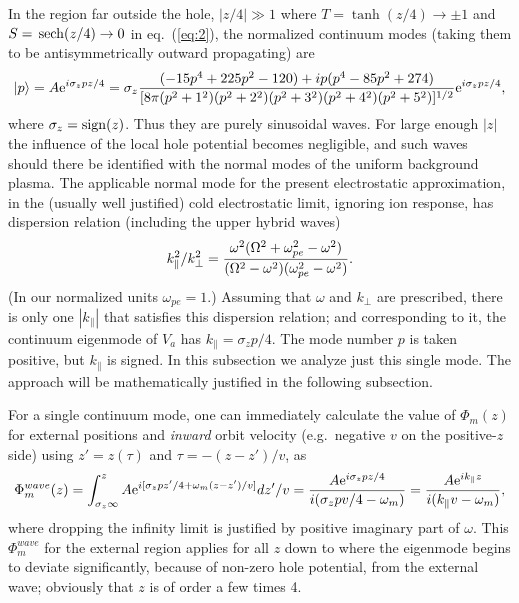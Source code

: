 \documentclass[12pt]{article}
\def\ket#1{|#1\rangle}
\def\sech{{\,\rm sech}}
\def\etothe#1{{\rm e}^{#1}}
\begin{document}
In the region far outside the hole, $|z/4|\gg 1$ where
$T=\tanh(z/4)\to\pm1$ and $S=\sech(z/4)\to0$ in eq.\ (\ref{eq:2}), the
normalized continuum modes (taking them to be antisymmetrically
outward propagating) are
\begin{equation}
  \label{eq:14}
 \ket{p}=A\etothe{i\sigma_zpz/4}=\sigma_z{(-15p^4+225p^2-120) +ip (p^{4}-85p^{2}+274)\over
      [8\pi(p^2+1^2)(p^2+2^2)(p^2+3^2)(p^2+4^2)(p^2+5^2)]^{1/2}}\etothe{i\sigma_zpz/4},
\end{equation}
where $\sigma_z={\rm sign}(z)$. Thus they are purely sinusoidal
waves. For large enough $|z|$ the influence of the local hole
potential becomes negligible, and such waves should there be
identified with the normal modes of the uniform background plasma.
The applicable normal mode for the present electrostatic
approximation, in the (usually well justified) cold electrostatic limit,
ignoring ion response, has dispersion relation (including the upper
hybrid waves)
\begin{equation}
  \label{eq:15}
  k_\parallel^2/k_\perp^2={\omega^2(\Omega^2+\omega_{pe}^2-\omega^2)
    \over(\Omega^2-\omega^2)(\omega_{pe}^2-\omega^2)}.
\end{equation}
(In our normalized units $\omega_{pe}=1$.)  Assuming that $\omega$ and
$k_\perp$ are prescribed, there is only one $|k_\parallel|$ that
satisfies this dispersion relation; and corresponding to it, the
continuum eigenmode of $V_a$ has $k_\parallel=\sigma_zp/4$. The mode
number $p$ is taken positive, but $k_\parallel$ is signed. In this
subsection we analyze just this single mode. The approach will be
mathematically justified in the following subsection.

For a single continuum mode, one can immediately calculate the value
of $\Phi_m(z)$ for external positions and \emph{inward} orbit velocity
(e.g.\ negative $v$ on the positive-$z$ side) using $z'=z(\tau)$ and
$\tau=-(z-z')/v$, as
\begin{equation}
  \label{Phiwave}
  \Phi_{m}^{wave}(z) = \int_{\sigma_z\infty}^zA{\rm e}^{i[\sigma_zpz'/4+\omega_m
    (z-z')/v]}dz'/v
  ={A{\rm e}^{i\sigma_zpz/4} \over i(\sigma_zpv/4-\omega_m)}={A{\rm e}^{ik_\parallel z} \over
    i(k_\parallel v-\omega_m)},
\end{equation}
where dropping the infinity limit is justified by positive imaginary
part of $\omega$.  This $\Phi_{m}^{wave}$ for the external 
region applies for all $z$ down to where the eigenmode begins to
deviate significantly, because of non-zero hole potential, from the
external wave; obviously that $z$ is of order a few times 4.
\end{document}
